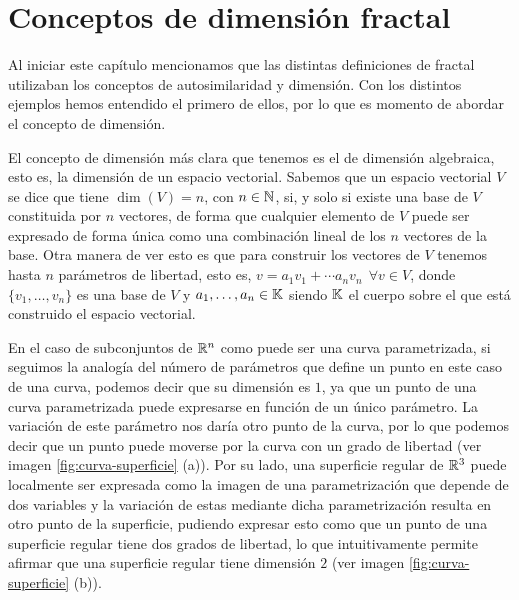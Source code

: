 \section{Conceptos de dimensión fractal}
\label{section:dimension}

Al iniciar este capítulo mencionamos que las distintas definiciones de fractal utilizaban los conceptos de autosimilaridad y dimensión. Con los distintos ejemplos hemos entendido el primero de ellos, por lo que es momento de abordar el concepto de dimensión. 

El concepto de dimensión más clara que tenemos es el de dimensión algebraica, esto es, la dimensión de un espacio vectorial. Sabemos que un espacio vectorial $V$ se dice que tiene $\dim(V)=n$, con $n\in\mathbb{N}$, si, y solo si existe una base de $V$ constituida por $n$ vectores, de forma que cualquier elemento de $V$ puede ser expresado de forma única como una combinación lineal de los $n$ vectores de la base. Otra manera de ver esto es que para construir los vectores de $V$ tenemos hasta $n$ parámetros de libertad, esto es, $v=a_1 v_1 +\cdots a_n v_n \ \ \forall v\in V$, donde $\{v_1,\dots,v_n\}$ es una base de $V$ y $a_1,\dots,a_n\in \mathbb{K}$ siendo $\mathbb{K}$ el cuerpo sobre el que está construido el espacio vectorial.

En el caso de subconjuntos de $\mathbb{R}^n$ como puede ser una curva parametrizada, si seguimos la analogía del número de parámetros que define un punto en este caso de una curva, podemos decir que su dimensión es $1$, ya que un punto de una curva parametrizada puede expresarse en función de un único parámetro. La variación de este parámetro nos daría otro punto de la curva, por lo que podemos decir que un punto puede moverse por la curva con un grado de libertad (ver imagen \ref{fig:curva-superficie} (a)). Por su lado, una superficie regular de $\mathbb{R}^3$ puede localmente ser expresada como la imagen de una parametrización que depende de dos variables y la variación de estas mediante dicha parametrización resulta en otro punto de la superficie, pudiendo expresar esto como que un punto de una superficie regular tiene dos grados de libertad, lo que intuitivamente permite afirmar que una superficie regular tiene dimensión $2$ (ver imagen \ref{fig:curva-superficie} (b)).

